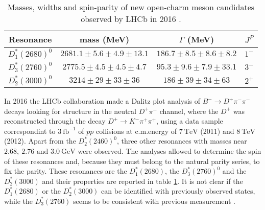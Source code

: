 \begin{table}
  \centering
  \begin{tabular}{c c c c}
    \toprule
    Resonance & mass (MeV) & $\Gamma$ (MeV) & $J^P$ \\ 
    \midrule
    $D^*_1(2680)^0$   & $2681.1 \pm 5.6 \pm 4.9 \pm 13.1$ & $186.7 \pm 8.5 \pm 8.6 \pm 8.2$  & $1^-$ \\
    $D^*_3(2760)^0$   & $2775.5 \pm 4.5 \pm 4.5 \pm 4.7$  & $95.3  \pm 9.6 \pm 7.9 \pm 33.1$ & $3^-$ \\
    $D^*_2(3000)^0$   & $3214   \pm 29  \pm 33  \pm 36$   & $186   \pm 39  \pm 34  \pm 63$   & $2^+$ \\
    \bottomrule
  \end{tabular}
  \caption{Masses, widths and spin-parity of new open-charm meson candidates observed by LHCb in 2016 \cite{Aaij:2016fma}.}
  \label{tab:LHCb_2016}
\end{table}

In 2016 the LHCb collaboration made a Dalitz plot analysis of $B^- \to D^+ \pi^- \pi^-$ decays \cite{Aaij:2016fma} looking for structure in the neutral $D^+ \pi^-$ channel, where the $D^+$ was reconstructed through the decay $D^+ \to K^- \pi^+ \pi^+$, using a data sample correspondint to $3 \ \text{fb}^{-1}$ of $p p$ collisions at c.m.\@ energy of $7 \ \text{TeV}$ (2011) and $8 \ \text{TeV}$ (2012). Apart from the $D^*_2(2460)^0$, three other resonances with masses near $2.68, \ 2.76 \text{ and } 3.0 \ \text{GeV}$ were observed. The analyses allowed to determine the spin of these resonances and, because they must belong to the natural parity series, to fix the parity. These resonances are the $D^*_1(2680)$, the $D^*_3(2760)^0$ and the $D^*_2(3000)$ and their properties are reported in table \ref{tab:LHCb_2016}. It is not clear if the $D^*_1(2680)$ or the $D^*_2(3000)$ can be identified with previously observed states, while the $D^*_3(2760)$ seems to be consistent with previous measurement \cite{delAmoSanchez:2010vq,Aaij:2013sza,Aaij:2016fma}.

